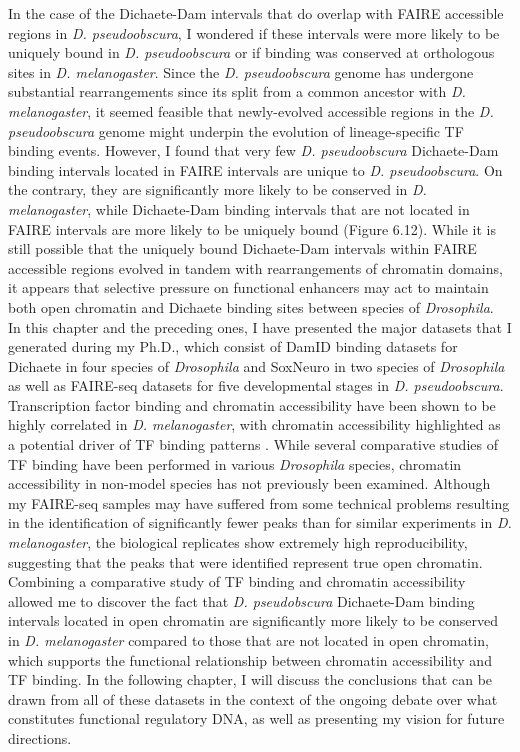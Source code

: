 In the case of the Dichaete-Dam intervals that do overlap with FAIRE accessible regions in \emph{D. pseudoobscura}, I wondered if these intervals were more likely to be uniquely bound in \emph{D. pseudoobscura} or if binding was conserved at orthologous sites in \emph{D. melanogaster}. Since the \emph{D. pseudoobscura} genome has undergone substantial rearrangements since its split from a common ancestor with \emph{D. melanogaster}, it seemed feasible that newly-evolved accessible regions in the \emph{D. pseudoobscura} genome might underpin the evolution of lineage-specific TF binding events. However, I found that very few \emph{D. pseudoobscura} Dichaete-Dam binding intervals located in FAIRE intervals are unique to \emph{D. pseudoobscura}. On the contrary, they are significantly more likely to be conserved in \emph{D. melanogaster}, while Dichaete-Dam binding intervals that are not located in FAIRE intervals are more likely to be uniquely bound (Figure 6.12). While it is still possible that the uniquely bound Dichaete-Dam intervals within FAIRE accessible regions evolved in tandem with rearrangements of chromatin domains, it appears that selective pressure on functional enhancers may act to maintain both open chromatin and Dichaete binding sites between species of \emph{Drosophila}.\\

In this chapter and the preceding ones, I have presented the major datasets that I generated during my Ph.D., which consist of DamID binding datasets for Dichaete in four species of \emph{Drosophila} and SoxNeuro in two species of \emph{Drosophila} as well as FAIRE-seq datasets for five developmental stages in \emph{D. pseudoobscura}. Transcription factor binding and chromatin accessibility have been shown to be highly correlated in \emph{D. melanogaster}, with chromatin accessibility highlighted as a potential driver of TF binding patterns \citep{kaplan_quantitative_2011, li_role_2011}. While several comparative studies of TF binding have been performed in various \emph{Drosophila} species, chromatin accessibility in non-model species has not previously been examined. Although my FAIRE-seq samples may have suffered from some technical problems resulting in the identification of significantly fewer peaks than for similar experiments in \emph{D. melanogaster}, the biological replicates show extremely high reproducibility, suggesting that the peaks that were identified represent true open chromatin. Combining a comparative study of TF binding and chromatin accessibility allowed me to discover the fact that \emph{D. pseudobscura} Dichaete-Dam binding intervals located in open chromatin are significantly more likely to be conserved in \emph{D. melanogaster} compared to those that are not located in open chromatin, which supports the functional relationship between chromatin accessibility and TF binding. In the following chapter, I will discuss the conclusions that can be drawn from all of these datasets in the context of the ongoing debate over what constitutes functional regulatory DNA, as well as presenting my vision for future directions.

